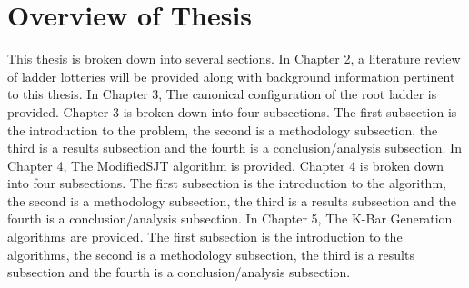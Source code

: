 \section{Overview of Thesis}
This thesis is broken down into several sections. In Chapter 2, a literature
review of ladder lotteries will be provided along with background information pertinent to this thesis. 
In Chapter 3, The canonical configuration of the root ladder is provided. 
Chapter 3 is broken down into four subsections. The first subsection is the introduction to the problem, 
the second is a methodology subsection, the third is a results 
subsection and the fourth is a conclusion/analysis subsection. 
In Chapter 4, The {\sc ModifiedSJT} algorithm is provided. Chapter 4 is broken down into four subsections.
The first subsection is the introduction to the algorithm, 
the second is a methodology subsection, the third is a results 
subsection and the fourth is a conclusion/analysis subsection. In Chapter 5, The {\sc K-Bar Generation} algorithms 
are provided. The first subsection is the introduction to the algorithms, 
the second is a methodology subsection, the third is a results 
subsection and the fourth is a conclusion/analysis subsection. 